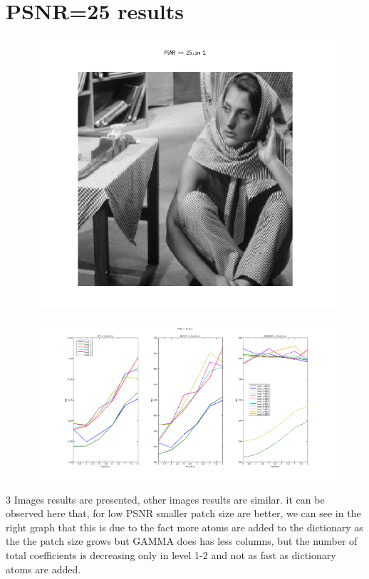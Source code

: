 \documentclass{article}
\begin{document}
\section{PSNR=25 results}
\begin{figure}[h]
\centering
    \begin{center}
       \includegraphics[scale=0.3]{1.png}
    \end{center}
    \noindent
\end{figure}
\begin{figure}[h]
\centering
  
    \begin{center}
       \includegraphics[width=180mm]{fig1L.png}
     
    \end{center}
\end{figure}
3 Images results are presented, other images results are similar.
it can be observed here that, for low PSNR smaller patch size are better, we can see in the right graph that this is due to the fact more atoms are added to the dictionary as the the patch size grows but GAMMA does has less columns, but the number of total coefficients is decreasing only in level 1-2 and not as fast as dictionary atoms are added.
\end{document}

